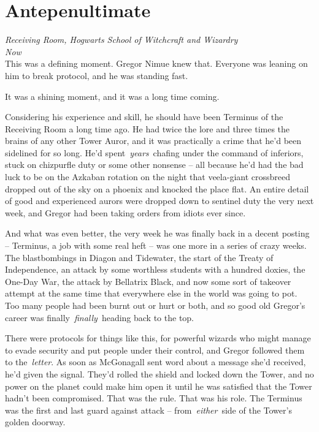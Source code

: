 \hypertarget{antepenultimate}{%
\chapter{Antepenultimate}\label{antepenultimate}}

\emph{Receiving Room, Hogwarts School of Witchcraft and Wizardry}\\
\emph{Now}\\

This was a defining moment. Gregor Nimue knew that. Everyone was leaning
on him to break protocol, and he was standing fast.

It was a shining moment, and it was a long time coming.

Considering his experience and skill, he should have been Terminus of
the Receiving Room a long time ago. He had twice the lore and three
times the brains of any other Tower Auror, and it was practically a
crime that he'd been sidelined for so long. He'd
spent~\emph{years}~chafing under the command of inferiors, stuck on
chizpurfle duty or some other nonsense -- all because he'd had the bad
luck to be on the Azkaban rotation on the night that veela-giant
crossbreed dropped out of the sky on a phoenix and knocked the place
flat. An entire detail of good and experienced aurors were dropped down
to sentinel duty the very next week, and Gregor had been taking orders
from idiots ever since.

And what was even better, the very week he was finally back in a decent
posting -- Terminus, a job with some real heft -- was one more in a
series of crazy weeks. The blastbombings in Diagon and Tidewater, the
start of the Treaty of Independence, an attack by some worthless
students with a hundred doxies, the One-Day War, the attack by Bellatrix
Black, and now some sort of takeover attempt at the same time that
everywhere else in the world was going to pot. Too many people had been
burnt out or hurt or both, and so good old Gregor's career was
finally~\emph{finally}~heading back to the top.

There were protocols for things like this, for powerful wizards who
might manage to evade security and put people under their control, and
Gregor followed them to the~\emph{letter}. As soon as McGonagall sent
word about a message she'd received, he'd given the signal. They'd
rolled the shield and locked down the Tower, and no power on the planet
could make him open it until he was satisfied that the Tower hadn't been
compromised. That was the rule. That was his role. The Terminus was the
first and last guard against attack -- from~\emph{either}~side of the
Tower's golden doorway.

